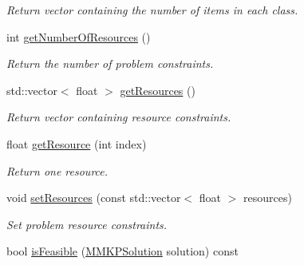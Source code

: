 \begin{DoxyCompactItemize}
\begin{DoxyCompactList}\small\item\em Return vector containing the number of items in each class. \end{DoxyCompactList}\item 
\hypertarget{class_m_m_k_p_data_set_abffa05d580864e36cb56a30ac6c7e4cd}{int \hyperlink{class_m_m_k_p_data_set_abffa05d580864e36cb56a30ac6c7e4cd}{get\+Number\+Of\+Resources} ()}\label{class_m_m_k_p_data_set_abffa05d580864e36cb56a30ac6c7e4cd}

\begin{DoxyCompactList}\small\item\em Return the number of problem constraints. \end{DoxyCompactList}\item 
\hypertarget{class_m_m_k_p_data_set_a6ca23f557da292d5dbf3b7d72ede13e3}{std\+::vector$<$ float $>$ \hyperlink{class_m_m_k_p_data_set_a6ca23f557da292d5dbf3b7d72ede13e3}{get\+Resources} ()}\label{class_m_m_k_p_data_set_a6ca23f557da292d5dbf3b7d72ede13e3}

\begin{DoxyCompactList}\small\item\em Return vector containing resource constraints. \end{DoxyCompactList}\item 
\hypertarget{class_m_m_k_p_data_set_a7a24bc2fc61dd807d68f6f8a1a177e40}{float \hyperlink{class_m_m_k_p_data_set_a7a24bc2fc61dd807d68f6f8a1a177e40}{get\+Resource} (int index)}\label{class_m_m_k_p_data_set_a7a24bc2fc61dd807d68f6f8a1a177e40}

\begin{DoxyCompactList}\small\item\em Return one resource. \end{DoxyCompactList}\item 
\hypertarget{class_m_m_k_p_data_set_aa5c2c6149784656487351e162614876c}{void \hyperlink{class_m_m_k_p_data_set_aa5c2c6149784656487351e162614876c}{set\+Resources} (const std\+::vector$<$ float $>$ resources)}\label{class_m_m_k_p_data_set_aa5c2c6149784656487351e162614876c}

\begin{DoxyCompactList}\small\item\em Set problem resource constraints. \end{DoxyCompactList}\item 
\hypertarget{class_m_m_k_p_data_set_ad36d7701adaa9fc55991e6f500637960}{bool \hyperlink{class_m_m_k_p_data_set_ad36d7701adaa9fc55991e6f500637960}{is\+Feasible} (\hyperlink{class_m_m_k_p_solution}{M\+M\+K\+P\+Solution} solution) const }\label{class_m_m_k_p_data_set_ad36d7701adaa9fc55991e6f500637960}


\end{DoxyCompactItemize}
